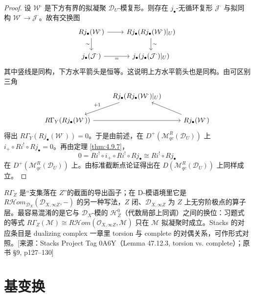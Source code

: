 \begin{proof}
设 $\mathcal{W}^\cdot$ 是下方有界的拟凝聚 $\mathcal{D}_U$-模复形。则存在 $j_\bullet$-无循环复形 $\mathcal{J}^\cdot$ 与拟同构
$\mathcal{W}^\cdot\to\mathcal{J}^\cdot$。故有交换图
$$\begin{tikzcd}
Rj_\bullet(\mathcal{W}^\cdot) \arrow[r] \arrow[d,"\sim"'] &
Rj_\bullet(Rj_\bullet(\mathcal{W}^\cdot)|_U) \arrow[d,"\sim"]\\
j_\bullet(\mathcal{J}^\cdot) \arrow[r,"="'] & j_\bullet(j_\bullet(\mathcal{J}^\cdot)|_U)
\end{tikzcd}$$
其中竖线是同构，下方水平箭头是恒等。这说明上方水平箭头也是同构。由可区别三角
$$\begin{tikzcd}
& Rj_\bullet(Rj_\bullet(\mathcal{W}^\cdot)|_U) \arrow[dl,"+1"'] & \\
R\Gamma_Y(Rj_\bullet(\mathcal{W}^\cdot)) \arrow[rr] && Rj_\bullet(\mathcal{W}^\cdot) \arrow[lu]
\end{tikzcd}$$
得出 $R\Gamma_Y(Rj_\bullet(\mathcal{W}^\cdot))=0$。于是由前述，在
$D^+(\mathcal{M}^R_{qc}(\mathcal{D}_U))$ 上 $i_+\circ Ri^!\circ Rj_\bullet=0$。再由定理 \ref{thm:4.9.7}，
$$0=Ri^!\circ i_+\circ Ri^!\circ Rj_\bullet\cong Ri^!\circ Rj_\bullet$$
在 $D^+(\mathcal{M}^R_{qc}(\mathcal{D}_U))$ 上。由标准截断点论证得出在 $D(\mathcal{M}^R_{qc}(\mathcal{D}_U))$ 上同样成立。
\end{proof}
\begin{annote}
$R\Gamma_Z$ 是“支集落在 $Z$”的截面的导出函子；在 D-模语境里它是 $R\mathcal H om_{\mathcal D_X}(\mathcal D_{X,\infty Z},-)$ 的另一种写法，$Z$ 闭、$\mathcal D_{X,\infty Z}$ 为 $Z$ 上无穷阶极点的算子层。最容易混淆的是它与 $\mathcal D_X$-模的 $\mathcal H^0_Z$（代数局部上同调）之间的换位：习题式的等式 $R\Gamma_Z(\mathcal M)\cong R\mathcal H om(\mathcal O_{X,\infty Z},\mathcal M)$ 只在 $\mathcal M$ 拟凝聚时成立。Stacks 的对应条目是 dualizing complex 一章里 torsion 与 complete 的对偶关系，可作形式对照。[来源：Stacks Project Tag 0A6Y（Lemma 47.12.3, torsion vs. complete）；原书 §9, p127–130]
\end{annote}



\section{基变换}

